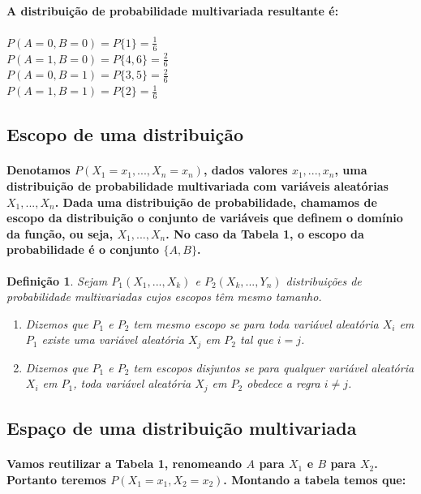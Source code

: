 \documentclass[a4paper,10pt]{article}
\theoremstyle{plain}
\newtheorem*{spn-def}{Definição}
\begin{document}
\paragraph{
  A distribuição de probabilidade multivariada resultante é:
}

\subparagraph{$P(A=0,B=0) = P\{1\} = \frac{1}{6}$ \\
  $P(A=1,B=0) = P\{4,6\} = \frac{2}{6}$ \\
  $P(A=0,B=1) = P\{3,5\} = \frac{2}{6}$ \\
  $P(A=1,B=1) = P\{2\} = \frac{1}{6}$
} 

\subsection{Escopo de uma distribuição}

\paragraph{
  Denotamos $P(X_1=x_1,...,X_n=x_n)$, dados valores $x_1,...,x_n$, uma distribuição de probabilidade multivariada
com variáveis aleatórias $X_1,...,X_n$. Dada uma distribuição de probabilidade, chamamos de escopo da distribuição 
o conjunto de variáveis que definem o domínio da função, ou seja, $X_1,...,X_n$. No caso da Tabela 1, o escopo da 
probabilidade é o conjunto $\{A, B\}$. 
}

\begin{spn-def} Sejam $P_1 (X_1,...,X_k)$ e $P_2 (X_k,...,Y_n)$ distribuições de probabilidade multivariadas cujos
  escopos têm mesmo tamanho.
\begin{enumerate} \itemsep0pt
  \item Dizemos que $P_1$ e $P_2$ tem mesmo escopo se para toda variável aleatória $X_i$ em $P_1$ existe uma
variável aleatória $X_j$ em $P_2$ tal que $i=j$.
  \item Dizemos que $P_1$ e $P_2$ tem escopos disjuntos se para qualquer variável aleatória $X_i$ em $P_1$,
toda variável aleatória $X_j$ em $P_2$ obedece a regra $i\neq{j}$. 
\end{enumerate}
\end{spn-def}

\subsection{Espaço de uma distribuição multivariada}

\paragraph{
  Vamos reutilizar a Tabela 1, renomeando $A$ para $X_1$ e $B$ para $X_2$. Portanto teremos $P(X_1=x_1,X_2=x_2)$. 
Montando a tabela temos que:
}
\end{document}
